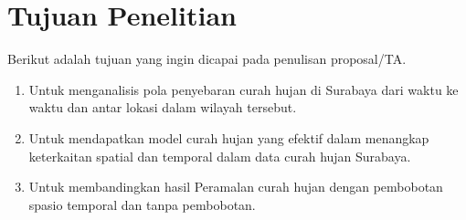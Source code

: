 \section{Tujuan Penelitian}
Berikut adalah tujuan yang ingin dicapai pada penulisan proposal/TA.
\begin{enumerate}
    \item Untuk menganalisis pola penyebaran curah hujan di Surabaya dari waktu ke waktu dan antar lokasi dalam wilayah tersebut.
    \item Untuk mendapatkan model curah hujan yang efektif  dalam menangkap keterkaitan spatial dan temporal dalam data curah hujan Surabaya.
    \item Untuk membandingkan hasil Peramalan curah hujan dengan pembobotan spasio temporal dan tanpa pembobotan.
\end{enumerate}
